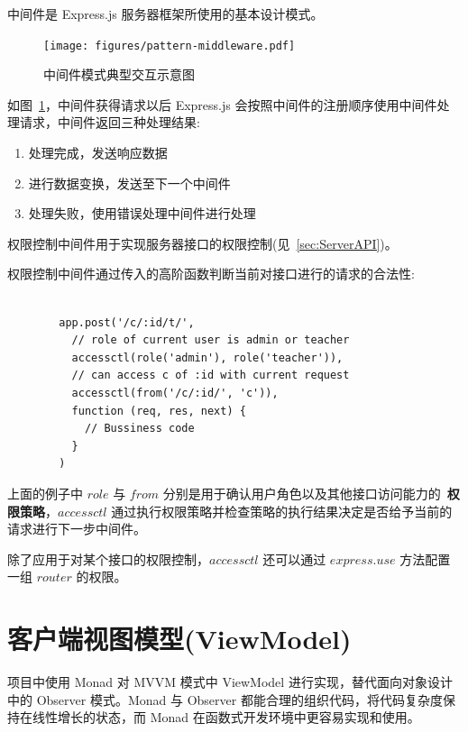 中间件是 Express.js 服务器框架所使用的基本设计模式。

\begin{figure}[!h]
  \begin{center}
    \texttt{[image: figures/pattern-middleware.pdf]}
    \caption{中间件模式典型交互示意图\label{ExpressMiddleware}}
  \end{center}
\end{figure}

如图~\ref{ExpressMiddleware}，中间件获得请求以后 Express.js 会按照中间件的注册顺序使用中间件处理请求，中间件返回三种处理结果:

\begin{enumerate}
  \item 处理完成，发送响应数据
  \item 进行数据变换，发送至下一个中间件
  \item 处理失败，使用错误处理中间件进行处理
\end{enumerate}

权限控制中间件用于实现服务器接口的权限控制(见~\ref{sec:ServerAPI})。

权限控制中间件通过传入的高阶函数判断当前对接口进行的请求的合法性:

\begin{verbatim}

        app.post('/c/:id/t/',
          // role of current user is admin or teacher
          accessctl(role('admin'), role('teacher')),
          // can access c of :id with current request
          accessctl(from('/c/:id/', 'c')),
          function (req, res, next) {
            // Bussiness code
          }
        )

\end{verbatim}

上面的例子中 $role$ 与 $from$ 分别是用于确认用户角色以及其他接口访问能力的~\textbf{权限策略}，$accessctl$ 通过执行权限策略并检查策略的执行结果决定是否给予当前的请求进行下一步中间件。

除了应用于对某个接口的权限控制，$accessctl$ 还可以通过 $express.use$ 方法配置一组 $router$ 的权限。

\section{客户端视图模型(ViewModel)}

项目中使用 Monad 对 MVVM 模式中 ViewModel 进行实现，替代面向对象设计中的 Observer 模式。Monad 与 Observer 都能合理的组织代码，将代码复杂度保持在线性增长的状态，而 Monad 在函数式开发环境中更容易实现和使用。

